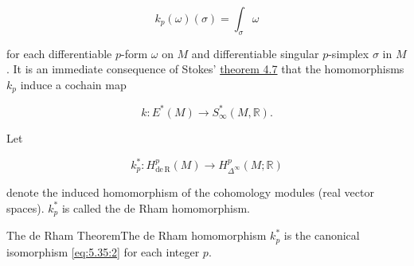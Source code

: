 \begin{equation}
\tag{4}\label{eq:5.35:4}
k_{p}(\omega)(\sigma)=\int_{\sigma}\omega
\end{equation}

for each differentiable $p$-form $\omega$ on $M$ and differentiable singular $p$-simplex $\sigma$ in $M$. It is an immediate consequence of Stokes' \hyperref[thm:4.7]{theorem 4.7} that the homomorphisms $k_{p}$ induce a cochain map

\begin{equation}
\tag{5}\label{eq:5.35:5}
k\colon E^{*}(M)\to S_{\infty}^{*}(M,\mathbb{R}).
\end{equation}

Let

\begin{equation}
\tag{6}\label{eq:5.35:6}
k_{p}^{*}\colon H_{\mathrm{de\,R}}^{p}(M)\to H_{\Delta^{\infty}}^{p}(M;\mathbb{R})
\end{equation}

denote the induced homomorphism of the cohomology modules (real vector spaces).  $ k_{p}^{*} $ is called the de Rham homomorphism.

\begin{theorem}{The de Rham Theorem}\label{thm:5.36}The de Rham homomorphism $k_{p}^{*}$ is the canonical isomorphism \eqref{eq:5.35:2} for each integer $p$.\end{theorem}

